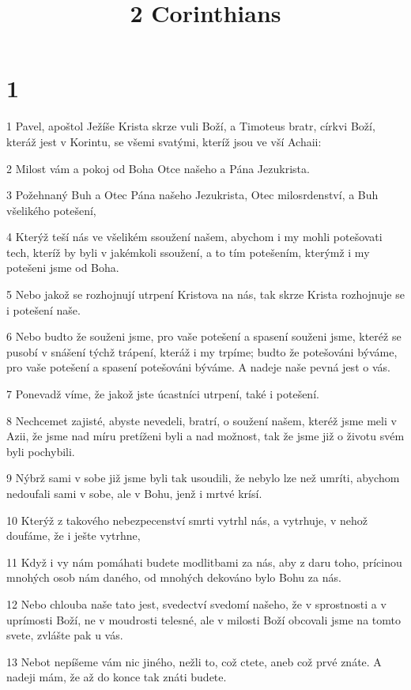 

\title{2 Corinthians}

\chapter{1}

\par 1 Pavel, apoštol Ježíše Krista skrze vuli Boží, a Timoteus bratr, církvi Boží, kteráž jest v Korintu, se všemi svatými, kteríž jsou ve vší Achaii:
\par 2 Milost vám a pokoj od Boha Otce našeho a Pána Jezukrista.
\par 3 Požehnaný Buh a Otec Pána našeho Jezukrista, Otec milosrdenství, a Buh všelikého potešení,
\par 4 Kterýž teší nás ve všelikém ssoužení našem, abychom i my mohli potešovati tech, kteríž by byli v jakémkoli ssoužení, a to tím potešením, kterýmž i my potešeni jsme od Boha.
\par 5 Nebo jakož se rozhojnují utrpení Kristova na nás, tak skrze Krista rozhojnuje se i potešení naše.
\par 6 Nebo budto že souženi jsme, pro vaše potešení a spasení souženi jsme, kteréž se pusobí v snášení týchž trápení, kteráž i my trpíme; budto že potešováni býváme, pro vaše potešení a spasení potešováni býváme. A nadeje naše pevná jest o vás.
\par 7 Ponevadž víme, že jakož jste úcastníci utrpení, také i potešení.
\par 8 Nechcemet zajisté, abyste nevedeli, bratrí, o soužení našem, kteréž jsme meli v Azii, že jsme nad míru pretíženi byli a nad možnost, tak že jsme již o životu svém byli pochybili.
\par 9 Nýbrž sami v sobe již jsme byli tak usoudili, že nebylo lze než umríti, abychom nedoufali sami v sobe, ale v Bohu, jenž i mrtvé krísí.
\par 10 Kterýž z takového nebezpecenství smrti vytrhl nás, a vytrhuje, v nehož doufáme, že i ješte vytrhne,
\par 11 Když i vy nám pomáhati budete modlitbami za nás, aby z daru toho, prícinou mnohých osob nám daného, od mnohých dekováno bylo Bohu za nás.
\par 12 Nebo chlouba naše tato jest, svedectví svedomí našeho, že v sprostnosti a v uprímosti Boží, ne v moudrosti telesné, ale v milosti Boží obcovali jsme na tomto svete, zvlášte pak u vás.
\par 13 Nebot nepíšeme vám nic jiného, nežli to, což ctete, aneb což prvé znáte. A nadeji mám, že až do konce tak znáti budete.
